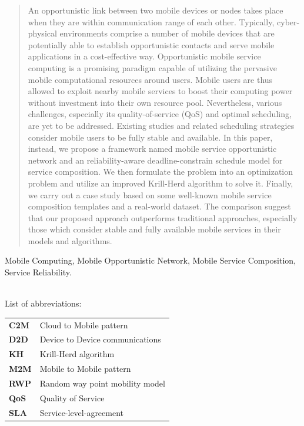 \documentclass[journal]{IEEEtran}
\begin{document}
\begin{abstract}
An opportunistic link between two mobile devices or nodes takes place when they are within communication range of each other. Typically, cyber-physical environments comprise a number of mobile devices that are potentially able to establish opportunistic contacts and serve mobile applications in a cost-effective way.
Opportunistic mobile service computing is a promising paradigm capable of utilizing the pervasive mobile computational resources around users. Mobile users are thus allowed to exploit nearby mobile services to boost their computing power without investment into their own resource pool. 
Nevertheless, various challenges, especially its quality-of-service (QoS) and optimal scheduling, are yet to be addressed. Existing studies and related scheduling strategies consider mobile users to be fully stable and available.
In this paper, instead, we propose a framework named mobile service opportunistic network and an reliability-aware deadline-constrain schedule model for service composition. 
We then formulate the problem into an optimization problem and utilize an improved Krill-Herd algorithm to solve it.
Finally, we carry out a case study based on some well-known mobile service composition templates and a real-world dataset. The comparison suggest that our proposed approach outperforms traditional approaches, especially those which consider stable and fully available mobile services  in their models and algorithms.
\end{abstract}

\begin{IEEEkeywords}
Mobile Computing, Mobile Opportunistic Network, Mobile Service Composition, Service Reliability.
\end{IEEEkeywords}

~\\
\noindent List of abbreviations:
~\\

\noindent
\begin{tabular}{@{} l p{7.36cm} }
\textbf{C2M}   &   Cloud to Mobile pattern\\
\textbf{D2D}   &   Device to Device communications \\
\textbf{KH}    &   Krill-Herd algorithm \\
\textbf{M2M}   &   Mobile to Mobile pattern \\
\textbf{RWP}   &   Random way point mobility model \\
\textbf{QoS}   &   Quality of Service \\
\textbf{SLA}   &   Service-level-agreement \\
\end{tabular}
\end{document}
